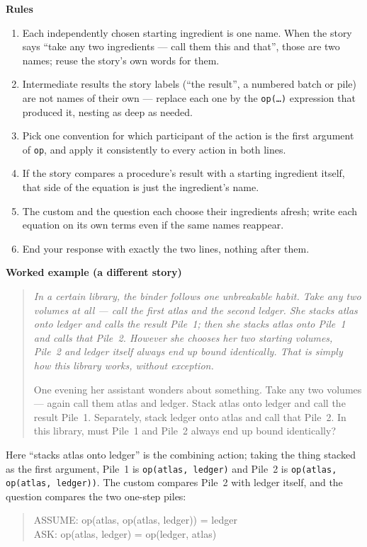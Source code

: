 \documentclass{article}
\begin{document}
\begin{promptbox}
\vspace{0.4em}
\noindent\textbf{Rules}
\begin{enumerate}
  \item Each independently chosen starting ingredient is one name. When the
    story says ``take any two ingredients --- call them this and that'', those
    are two names; reuse the story's own words for them.
  \item Intermediate results the story labels (``the result'', a numbered
    batch or pile) are not names of their own --- replace each one by the
    \texttt{op(\ldots)} expression that produced it, nesting as deep as needed.
  \item Pick one convention for which participant of the action is the first
    argument of \texttt{op}, and apply it consistently to every action in both
    lines.
  \item If the story compares a procedure's result with a starting ingredient
    itself, that side of the equation is just the ingredient's name.
  \item The custom and the question each choose their ingredients afresh;
    write each equation on its own terms even if the same names reappear.
  \item End your response with exactly the two lines, nothing after them.
\end{enumerate}

\vspace{0.4em}
\noindent\textbf{Worked example (a different story)}
\begin{quote}\itshape
In a certain library, the binder follows one unbreakable habit. Take any
two volumes at all --- call the first atlas and the second ledger. She
stacks atlas onto ledger and calls the result Pile~1; then she stacks
atlas onto Pile~1 and calls that Pile~2. However she chooses her two
starting volumes, Pile~2 and ledger itself always end up bound
identically. That is simply how this library works, without exception.

\medskip
One evening her assistant wonders about something. Take any two volumes ---
again call them atlas and ledger. Stack atlas onto ledger and call the
result Pile~1. Separately, stack ledger onto atlas and call that Pile~2.
In this library, must Pile~1 and Pile~2 always end up bound identically?
\end{quote}

Here ``stacks atlas onto ledger'' is the combining action; taking the thing
stacked as the first argument, Pile~1 is \texttt{op(atlas, ledger)} and
Pile~2 is \texttt{op(atlas, op(atlas, ledger))}. The custom compares Pile~2
with ledger itself, and the question compares the two one-step piles:
\begin{quote}\ttfamily
ASSUME: op(atlas, op(atlas, ledger)) = ledger\\
ASK: op(atlas, ledger) = op(ledger, atlas)
\end{quote}


\end{promptbox}
\end{document}
